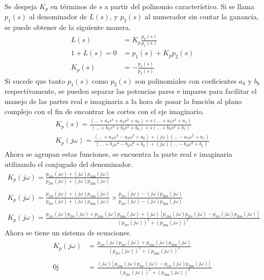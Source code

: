 \begin{itemize}
  Se despeja $K_p$ en términos de $s$ a partir del polinomio característico. Si se llama $p_1(s)$ al denominador de $L(s)$, y $p_2(s)$ al numerador sin contar la ganancia, se puede obtener de la siguiente manera.
  \begin{align*}
    L(s) &= K_p\frac{p_2(s)}{p_1(s)}
    \\
    1+L(s) = 0 &= p_1(s) + K_p p_2(s)
    \\
    K_p(s) &= -\frac{p_1(s)}{p_2(s)}
  \end{align*}
  Si sucede que tanto $p_1(s)$ como $p_2(s)$ son polinomiales con coeficientes $a_k$ y $b_k$ respectivamente, se pueden separar las potencias pares e impares para facilitar el manejo de las partes real e imaginaria a la hora de pasar la función al plano complejo con el fin de encontrar los cortes con el eje imaginario.
  \begin{align*}
    K_p(s) = \frac{(...+a_4s^4+a_2s^2+a_0) + s(...+a_3s^2+a_1)}{(...+b_4s^4+b_2s^2+b_0) + s(...+b_3s^2+b_1)}
    \\
    K_p(j\omega) = \frac
    {(...+a_4\omega^4-a_2\omega^2+a_0) + (j\omega)(...-a_3\omega^2+a_1)}
    {(...+b_4\omega^4-b_2\omega^2+b_0) + (j\omega)(...-b_3\omega^2+b_1)}
  \end{align*}
  Ahora se agrupan estas funciones, se encuentra la parte real e imaginaria utilizando el conjugado del denominador.
  \begin{align*}
    K_p(j\omega) = \frac
    {p_{1\text{re}}(j\omega) + (j\omega)p_{1\text{im}}(j\omega)}
    {p_{2\text{re}}(j\omega) + (j\omega)p_{2\text{im}}(j\omega)}
    \\\\
    K_p(j\omega) = \frac
    {p_{1\text{re}}(j\omega) + (j\omega)p_{1\text{im}}(j\omega)}
    {p_{2\text{re}}(j\omega) + (j\omega)p_{2\text{im}}(j\omega)}
    \times \frac
    {p_{2\text{re}}(j\omega) - (j\omega)p_{2\text{im}}(j\omega)}
    {p_{2\text{re}}(j\omega) - (j\omega)p_{2\text{im}}(j\omega)}
    \\\\
    K_p(j\omega) = \frac
    {p_{1\text{re}}(j\omega) p_{2\text{re}}(j\omega) + p_{1\text{im}}(j\omega) p_{2\text{im}}(j\omega)  + (j\omega)\left[p_{1\text{im}}(j\omega) p_{2\text{re}}(j\omega) -  p_{1\text{re}}(j\omega) p_{2\text{im}}(j\omega)\right]}
    {(p_{2\text{re}}(j\omega))^2 + (p_{2\text{im}}(j\omega))^2}
  \end{align*}
  Ahora se tiene un sistema de ecuaciones.
  \begin{align*}
    K_p(j\omega) &= \frac
    {p_{1\text{re}}(j\omega) p_{2\text{re}}(j\omega) + p_{1\text{im}}(j\omega) p_{2\text{im}}(j\omega)}
    {(p_{2\text{re}}(j\omega))^2 + (p_{2\text{im}}(j\omega))^2}
    \\
    \\
    0\text{j} &= \frac
    {(j\omega)\left[p_{1\text{im}}(j\omega) p_{2\text{re}}(j\omega) -  p_{1\text{re}}(j\omega) p_{2\text{im}}(j\omega)\right]}
    {(p_{2\text{re}}(j\omega))^2 + (p_{2\text{im}}(j\omega))^2}
  \end{align*}
  

\end{itemize}
